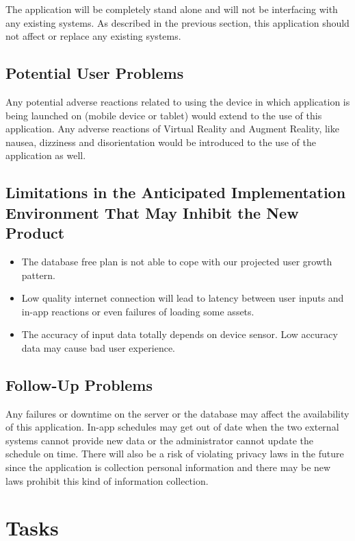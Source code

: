 \documentclass[12pt]{article}
\begin{document}
The application will be completely stand alone and will not be interfacing with any existing systems.  As described in the previous section, this application should not affect or replace any existing systems.

\subsection{Potential User Problems}

Any potential adverse reactions related to using the device in which application is being launched on (mobile device or tablet) would extend to the use of this application.  Any adverse reactions of Virtual Reality and Augment Reality, like nausea, dizziness and disorientation would be introduced to the use of the application as well.

\subsection{Limitations in the Anticipated Implementation Environment That May
Inhibit the New Product}

\begin{itemize}
\item The database free plan is not able to cope with our projected user growth pattern.
\item Low quality internet connection will lead to latency between user inputs and in-app reactions or even failures of loading some assets.
\item The accuracy of input data totally depends on device sensor. Low accuracy data may cause bad user experience.
\end{itemize}

\subsection{Follow-Up Problems}

Any failures or downtime on the server or the database may affect the availability of this application. In-app schedules may get out of date when the two external systems cannot provide new data or the administrator cannot update the schedule on time. There will also be a risk of violating privacy laws in the future since the application is collection personal information and there may be new laws prohibit this kind of information collection.

\section{Tasks}
\end{document}
